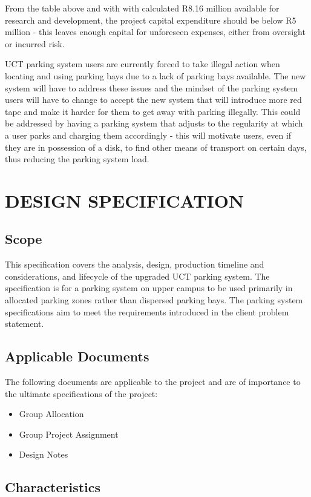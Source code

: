 From the table above and with with calculated R8.16 million available for research and development, the project capital expenditure should be below R5 million - this leaves enough capital for unforeseen expenses, either from oversight or incurred risk.

UCT parking system users are currently forced to take illegal action when locating and using parking bays due to a lack of parking bays available. The new system will have to address these issues and the mindset of the parking system users will have to change to accept the new system that will introduce more red tape and make it harder for them to get away with parking illegally. This could be addressed by having a parking system that adjusts to the regularity at which a user parks and charging them accordingly - this will motivate users, even if they are in possession of a disk, to find other means of transport on certain days, thus reducing the parking system load.

\newpage
\section{DESIGN SPECIFICATION}
\subsection{Scope}
This specification covers the analysis, design, production timeline and considerations, and lifecycle of the upgraded UCT parking system. The specification is for a parking system on upper campus to be used primarily in allocated parking zones rather than dispersed parking bays. The parking system specifications aim to meet the requirements introduced in the client problem statement.

\subsection{Applicable Documents}
The following documents are applicable to the project and are of importance to the ultimate specifications of the project:
\begin{itemize}
\item Group Allocation
\item Group Project Assignment
\item Design Notes
\end{itemize}

\subsection{Characteristics}
